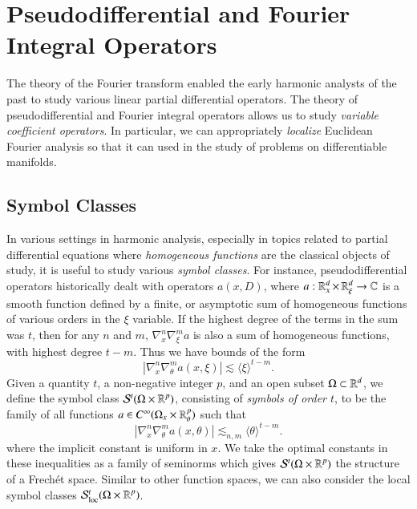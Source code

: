 
\part{Pseudodifferential and Fourier Integral Operators}

The theory of the Fourier transform enabled the early harmonic analysts of the past to study various linear partial differential operators. The theory of pseudodifferential and Fourier integral operators allows us to study \emph{variable coefficient operators}. In particular, we can appropriately \emph{localize} Euclidean Fourier analysis so that it can used in the study of problems on differentiable manifolds.



\chapter{Symbol Classes}

In various settings in harmonic analysis, especially in topics related to partial differential equations where \emph{homogeneous functions} are the classical objects of study, it is useful to study various \emph{symbol classes}. For instance, pseudodifferential operators historically dealt with operators $a(x,D)$, where $a: \operatorname{\mathbb{R}}^d_x \times \operatorname{\mathbb{R}}^d_\xi \to \operatorname{\mathbb{C}}$ is a smooth function defined by a finite, or asymptotic sum of homogeneous functions of various orders in the $\xi$ variable. If the highest degree of the terms in the sum was $t$, then for any $n$ and $m$, $\nabla^n_x \nabla^m_\xi a$ is also a sum of homogeneous functions, with highest degree $t - m$. Thus we have bounds of the form
%
\[ | \nabla^n_x \nabla^m_\theta a(x,\xi) | \lesssim \langle \xi \rangle^{t - m}. \]
%
Given a quantity $t$, a non-negative integer $p$, and an open subset $\Omega \subset \operatorname{\mathbb{R}}^d$, we define the symbol class $\mathcal{S}^t(\Omega \times \operatorname{\mathbb{R}}^p)$, consisting of \emph{symbols of order $t$}, to be the family of all functions $a \in C^\infty(\Omega_x \times \operatorname{\mathbb{R}}^p_\theta)$ such that
%
\[ |\nabla^n_x \nabla^m_\theta a(x,\theta)| \lesssim_{n,m} \langle \theta \rangle^{t-m}. \]
%
where the implicit constant is uniform in $x$. We take the optimal constants in these inequalities as a family of seminorms which gives $\mathcal{S}^t(\Omega \times \operatorname{\mathbb{R}}^p)$ the structure of a Frech\'{e}t space. Similar to other function spaces, we can also consider the local symbol classes $\mathcal{S}^t_{\text{loc}}(\Omega \times \operatorname{\mathbb{R}}^p)$.

